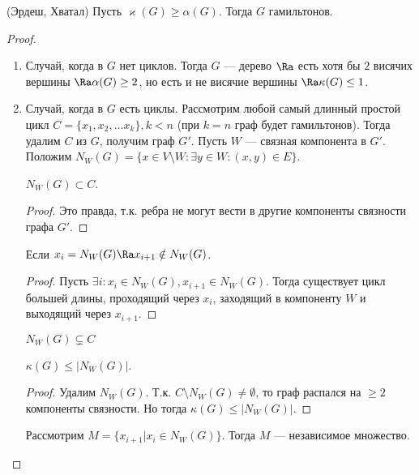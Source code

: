\begin{theorem}{(Эрдеш, Хватал)}
    Пусть \(\varkappa(G) \ge \alpha(G)\). Тогда \(G\) гамильтонов. 
\end{theorem}
\begin{proof}
    \begin{enumerate}
        \item Случай, когда в \(G\) нет циклов. Тогда \(G\) --- дерево \(\Ra\) есть хотя бы \(2\) висячих вершины \(\Ra \alpha(G) \ge 2\), но есть и не висячие вершины \(\Ra \kappa(G) \le 1\).
        \item Случай, когда в \(G\) есть циклы. Рассмотрим любой самый длинный простой цикл \(C = \{x_1, x_2, \dots x_k\}, k < n\) (при \(k = n\) граф будет гамильтонов). Тогда удалим \(C\) из \(G\), получим граф \(G'\). Пусть \(W\) --- связная компонента в \(G'\). Положим \(N_W(G) = \{x \in V \setminus W: \exists y \in W: (x, y) \in E\}\).
        \begin{proposition}
            \(N_W(G) \subset C\).
        \end{proposition}
        \begin{proof}
            Это правда, т.к. ребра не могут вести в другие компоненты связности графа \(G'\).
        \end{proof}
        \begin{proposition}
            Если \(x_i = N_W(G) \Ra x_{i + 1} \notin N_W(G)\).
        \end{proposition}
        \begin{proof}
            Пусть \(\exists i: x_i \in N_W(G), x_{i + 1} \in N_W(G)\). Тогда существует цикл большей длины, проходящий через \(x_i\), заходящий в компоненту \(W\) и выходящий через \(x_{i + 1}\).
        \end{proof}
        \begin{corollary}
            \(N_W(G) \subsetneq C\)
        \end{corollary}
        \begin{proposition}
            \(\kappa(G) \le |N_W(G)|\).
        \end{proposition}
        \begin{proof}
            Удалим \(N_W(G)\). Т.к. \(C \setminus N_W(G) \ne \emptyset\), то граф распался на \(\ge 2\) компоненты связности. Но тогда \(\kappa(G) \le |N_W(G)|\).
        \end{proof}
        \begin{proposition}
            Рассмотрим \(M = \{x_{i + 1} | x_i \in N_W(G)\}\). Тогда \(M\) --- независимое множество.

\end{proposition}
\end{enumerate}
\end{proof}
